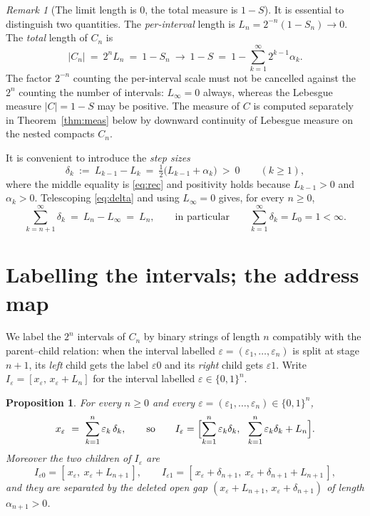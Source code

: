\documentclass{amsart}
\newtheorem{proposition}{Proposition}
\theoremstyle{definition}
\theoremstyle{remark}
\newtheorem{remark}{Remark}
\begin{document}
\begin{remark}[The limit length is $0$, the total measure is $1-S$]
It is essential to distinguish two quantities. The \emph{per-interval} length is
$L_n=2^{-n}(1-S_n)\to0$. The \emph{total} length of $C_n$ is
\[
|C_n|\ =\ 2^{n}L_n\ =\ 1-S_n\ \longrightarrow\ 1-S\ =\ 1-\sum_{k=1}^{\infty}2^{k-1}\alpha_k .
\]
The factor $2^{-n}$ counting the per-interval scale must not be cancelled against
the $2^{n}$ counting the number of intervals: $L_\infty=0$ always, whereas the
Lebesgue measure $|C|=1-S$ may be positive. The measure of $C$ is computed
separately in Theorem~\ref{thm:meas} below by downward continuity of Lebesgue
measure on the nested compacts $C_n$.
\end{remark}

It is convenient to introduce the \emph{step sizes}
\begin{equation}\label{eq:delta}
\delta_k\ :=\ L_{k-1}-L_k\ =\ \tfrac12\bigl(L_{k-1}+\alpha_k\bigr)\ >\ 0
\qquad(k\ge1),
\end{equation}
where the middle equality is \eqref{eq:rec} and positivity holds because
$L_{k-1}>0$ and $\alpha_k>0$. Telescoping \eqref{eq:delta} and using $L_\infty=0$
gives, for every $n\ge0$,
\begin{equation}\label{eq:tail}
\sum_{k=n+1}^{\infty}\delta_k\ =\ L_n-L_\infty\ =\ L_n,
\qquad\text{in particular}\qquad
\sum_{k=1}^{\infty}\delta_k=L_0=1<\infty .
\end{equation}

\section{Labelling the intervals; the address map}

We label the $2^n$ intervals of $C_n$ by binary strings of length $n$ compatibly
with the parent--child relation: when the interval labelled
$\varepsilon=(\varepsilon_1,\dots,\varepsilon_n)$ is split at stage $n+1$, its
\emph{left} child gets the label $\varepsilon0$ and its \emph{right} child gets
$\varepsilon1$. Write $I_\varepsilon=[x_\varepsilon,\,x_\varepsilon+L_n]$ for the
interval labelled $\varepsilon\in\{0,1\}^n$.

\begin{proposition}\label{prop:endpoint}
For every $n\ge0$ and every $\varepsilon=(\varepsilon_1,\dots,\varepsilon_n)\in\{0,1\}^n$,
\begin{equation}\label{eq:xeps}
x_\varepsilon\ =\ \sum_{k=1}^{n}\varepsilon_k\,\delta_k ,
\qquad\text{so}\qquad
I_\varepsilon=\Bigl[\sum_{k=1}^{n}\varepsilon_k\delta_k,\ \
\sum_{k=1}^{n}\varepsilon_k\delta_k+L_n\Bigr].
\end{equation}
Moreover the two children of $I_\varepsilon$ are
\begin{equation}\label{eq:children}
I_{\varepsilon0}=[\,x_\varepsilon,\ x_\varepsilon+L_{n+1}\,],
\qquad
I_{\varepsilon1}=[\,x_\varepsilon+\delta_{n+1},\ x_\varepsilon+\delta_{n+1}+L_{n+1}\,],
\end{equation}
and they are separated by the deleted open gap $(x_\varepsilon+L_{n+1},\,x_\varepsilon+\delta_{n+1})$ of length $\alpha_{n+1}>0$.
\end{proposition}
\end{document}
